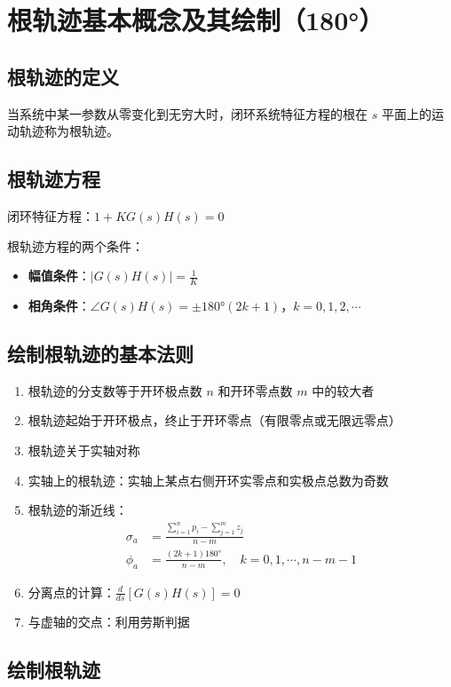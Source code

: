 \section{根轨迹基本概念及其绘制（180°）}

\subsection{根轨迹的定义}
当系统中某一参数从零变化到无穷大时，闭环系统特征方程的根在 $s$ 平面上的运动轨迹称为根轨迹。

\subsection{根轨迹方程}
闭环特征方程：$1 + KG(s)H(s) = 0$

根轨迹方程的两个条件：
\begin{itemize}
    \item \textbf{幅值条件}：$|G(s)H(s)| = \frac{1}{K}$
    \item \textbf{相角条件}：$\angle G(s)H(s) = \pm 180°(2k+1)$，$k = 0, 1, 2, \cdots$
\end{itemize}

\subsection{绘制根轨迹的基本法则}
\begin{enumerate}
    \item 根轨迹的分支数等于开环极点数 $n$ 和开环零点数 $m$ 中的较大者
    \item 根轨迹起始于开环极点，终止于开环零点（有限零点或无限远零点）
    \item 根轨迹关于实轴对称
    \item 实轴上的根轨迹：实轴上某点右侧开环实零点和实极点总数为奇数
    \item 根轨迹的渐近线：
    \begin{align}
    \sigma_a &= \frac{\sum_{i=1}^n p_i - \sum_{j=1}^m z_j}{n-m} \\
    \phi_a &= \frac{(2k+1)180°}{n-m}, \quad k = 0, 1, \cdots, n-m-1
    \end{align}
    \item 分离点的计算：$\frac{d}{ds}[G(s)H(s)] = 0$
    \item 与虚轴的交点：利用劳斯判据
\end{enumerate}

\subsection{绘制根轨迹}

